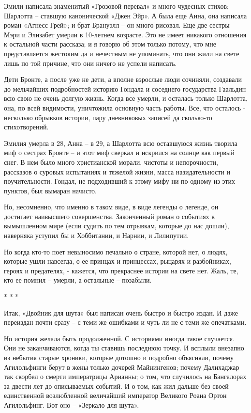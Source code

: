 Эмили написала знаменитый «Грозовой перевал» и много чудесных стихов; Шарлотта
– ставшую канонической «Джен Эйр». А была еще Анна, она написала роман «Агнесс
Грей»; и брат Брануэлл – он много рисовал. Еще две сестры Мэри и Элизабет
умерли в 10-летнем возрасте. Это не имеет никакого отношения к остальной части
рассказа; и я говорю об этом только потому, что мне представляется жестоким да
и нечестным не упоминать, что они жили на свете лишь по той причине, что они
ничего не успели написать.

Дети Бронте, а после уже не дети, а вполне взрослые люди сочиняли, создавали до
мельчайших подробностей историю Гондала и соседнего государства Гаальдин всю
свою не очень долгую жизнь. Когда все умерли, и осталась только Шарлотта, она,
по всей видимости, уничтожила основную часть работы. Все, что осталось -
несколько обрывков истории, пару дневниковых записей да сколько-то
стихотворений.

Эмилия умерла в 28, Анна – в 29, а Шарлотта всю оставшуюся жизнь творила миф о
сестрах Бронте – и этот миф сверкал и искрился на солнце как первый снег. В нем
было много христианской морали, чистоты и непорочности, рассказов о суровых
испытаниях и тяжелой жизни, масса назидательности и поучительности. Гондал, не
подходивший к этому мифу ни по одному из этих пунктов, был вымаран начисто.

Но, несомненно, что именно в таком виде, в виде легенды о легенде, он достигает
наивысшего совершенства. Законченный роман о событиях в вымышленном мире (если
судить по тем отрывкам, которые до нас дошли), наверняка уступил бы и
Хоббитании, и Нарнии, и Лилипутии.

Но когда кто-то поет невыносимо печально о стране, которой нет, о людях,
которые ушли навсегда, о ее принцах и принцессах, рыцарях и разбойниках, героях
и предателях, - кажется, что прекраснее истории на свете нет. Жаль, те, кто ее
помнил – умерли, а остальные – позабыли.

* * *

Итак, «Двойник для шута» был написан очень быстро и быстро издан. И даже
переиздан почти сразу – с теми же ошибками и чуть ли не с теми же опечатками.

Но история желала быть продолженной. С историями иногда такое случается. Они не
заканчиваются, когда ты ставишь последнюю точку. И всплыли внезапно из небытия
старые хроники, которые дотошно и подробно объясняли, почему Агилольфинги берут
в жены только дочерей Майнингенов; почему Далихаджар так скорбел о смерти
императрицы Арианны; о том, что случилось на Бангалорах за двести лет до
описываемых событий. И о том, как жил дальше без своей единственной
возлюбленной величайший император Великого Роана Ортон Агилольфинг. Вот оно –
«Зеркало для шута».

